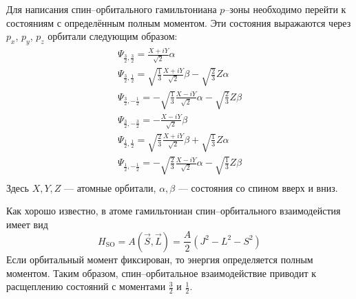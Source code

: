 Для написания
спин--орбитального гамильтониана $p$--зоны необходимо перейти к состояниям с определённым
полным моментом. Эти состояния выражаются через $p_x$, $p_y$, $p_z$ орбитали следующим образом:
\begin{equation}
	\label{transform1}
	\begin{gathered}
        \Psi_{\frac{3}{2},\frac{3}{2}} = \frac{X + iY}{\sqrt{2}}\alpha\\
        \Psi_{\frac{3}{2}, \frac{1}{2}} = \sqrt{\frac{1}{3}}\frac{X + iY}{\sqrt{2}}\beta -
                                         \sqrt{\frac{2}{3}} Z\alpha\\
        \Psi_{\frac{3}{2}, -\frac{1}{2}} = -\sqrt{\frac{1}{3}}\frac{X - iY}{\sqrt{2}}\alpha -
                                         \sqrt{\frac{2}{3}} Z\beta\\
        \Psi_{\frac{3}{2},-\frac{3}{2}} = -\frac{X - iY}{\sqrt{2}}\beta
	\end{gathered}
\end{equation}
\begin{equation}
	\label{transform2}
	\begin{gathered}
        \Psi_{\frac{1}{2}, \frac{1}{2}} = \sqrt{\frac{2}{3}}\frac{X + iY}{\sqrt{2}}\beta +
                                         \sqrt{\frac{1}{3}} Z\alpha\\
        \Psi_{\frac{1}{2}, -\frac{1}{2}} = -\sqrt{\frac{2}{3}}\frac{X - iY}{\sqrt{2}}\alpha-
                                         \sqrt{\frac{1}{3}} Z\beta\\
	\end{gathered}
\end{equation}
Здесь $X,Y,Z$ --- атомные орбитали, $\alpha,\beta$ --- состояния со спином вверх и вниз.

Как хорошо известно, в атоме гамильтониан спин--орбитального взаимодейстия имеет вид
\begin{equation}
    H_{\mathrm{SO}} =  A(\vec{S}, \vec{L}) = \frac{A}{2}(J^2 - L^2 - S^2)
\end{equation}
Если орбитальный момент фиксирован, то энергия определяется полным моментом. Таким образом,
спин--орбитальное взаимодействие приводит к расщеплению состояний с моментами $\frac32$ и
$\frac12$.

